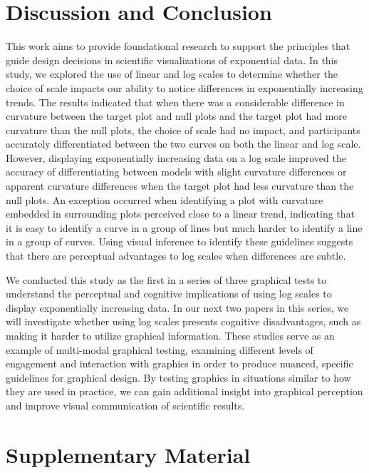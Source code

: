 \documentclass[12pt]{article}
\begin{document}
\hypertarget{discussion-conclusion}{%
\section{Discussion and Conclusion}\label{discussion-conclusion}}

This work aims to provide foundational research to support the
principles that guide design decisions in scientific visualizations of
exponential data. In this study, we explored the use of linear and log
scales to determine whether the choice of scale impacts our ability to
notice differences in exponentially increasing trends. The results
indicated that when there was a considerable difference in curvature
between the target plot and null plots and the target plot had more
curvature than the null plots, the choice of scale had no impact, and
participants accurately differentiated between the two curves on both
the linear and log scale. However, displaying exponentially increasing
data on a log scale improved the accuracy of differentiating between
models with slight curvature differences or apparent curvature
differences when the target plot had less curvature than the null plots.
An exception occurred when identifying a plot with curvature embedded in
surrounding plots perceived close to a linear trend, indicating that it
is easy to identify a curve in a group of lines but much harder to
identify a line in a group of curves. Using visual inference to identify
these guidelines suggests that there are perceptual advantages to log
scales when differences are subtle.

We conducted this study as the first in a series of three graphical
tests to understand the perceptual and cognitive implications of using
log scales to display exponentially increasing data. In our next two
papers in this series, we will investigate whether using log scales
presents cognitive disadvantages, such as making it harder to utilize
graphical information. These studies serve as an example of multi-modal
graphical testing, examining different levels of engagement and
interaction with graphics in order to produce nuanced, specific
guidelines for graphical design. By testing graphics in situations
similar to how they are used in practice, we can gain additional insight
into graphical perception and improve visual communication of scientific
results.

\hypertarget{supplementary-material}{%
\section*{Supplementary Material}\label{supplementary-material}}
\end{document}
